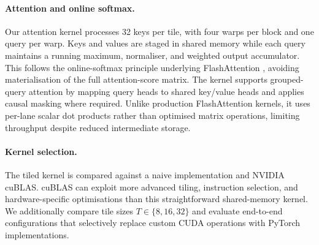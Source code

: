 \paragraph{Attention and online softmax.}
Our attention kernel processes 32 keys per tile,
with four warps per block and one query per warp.
Keys and values are staged in shared memory while
each query maintains a running maximum, normaliser,
and weighted output accumulator. This follows the
online-softmax principle underlying FlashAttention
\citep{dao2022flashattention}, avoiding materialisation
of the full attention-score matrix. The kernel supports
grouped-query attention by mapping query heads to
shared key/value heads and applies causal masking
where required. Unlike production FlashAttention
kernels, it uses per-lane scalar dot products rather
than optimised matrix operations, limiting throughput
despite reduced intermediate storage.

\paragraph{Kernel selection.}
The tiled kernel is compared against a naive implementation and
NVIDIA cuBLAS. cuBLAS can exploit more advanced tiling, instruction
selection, and hardware-specific optimisations than this
straightforward shared-memory kernel. We additionally compare
tile sizes $T\in\{8,16,32\}$ and evaluate end-to-end configurations
that selectively replace custom CUDA operations with PyTorch
implementations.
